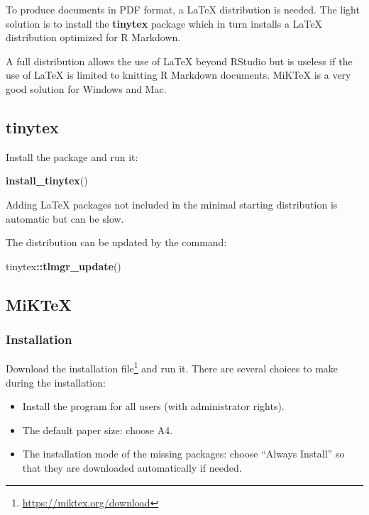 \documentclass[
  12pt,
  american,
  a4paper,
  extrafontsizes,onecolumn,openright
  ]{memoir}
\newenvironment{Shaded}{\begin{snugshade}}{\end{snugshade}}
\newcommand{\FunctionTok}[1]{\textcolor[rgb]{0.13,0.29,0.53}{\textbf{#1}}}
\newcommand{\NormalTok}[1]{#1}
\newcommand{\SpecialCharTok}[1]{\textcolor[rgb]{0.81,0.36,0.00}{\textbf{#1}}}
\providecommand{\tightlist}{%
  \setlength{\itemsep}{0pt}\setlength{\parskip}{0pt}}
\begin{document}
To produce documents in PDF format, a LaTeX distribution is needed.
The light solution is to install the \textbf{tinytex} package which in turn installs a LaTeX distribution optimized for R Markdown.

A full distribution allows the use of LaTeX beyond RStudio but is useless if the use of LaTeX is limited to knitting R Markdown documents.
MiKTeX is a very good solution for Windows and Mac.

\subsection{tinytex}\label{tinytex}

Install the package and run it:

\scriptsize

\begin{Shaded}
\begin{Highlighting}[]
\FunctionTok{install\_tinytex}\NormalTok{()}
\end{Highlighting}
\end{Shaded}

\normalsize

Adding LaTeX packages not included in the minimal starting distribution is automatic but can be slow.

The distribution can be updated by the command:

\scriptsize

\begin{Shaded}
\begin{Highlighting}[]
\NormalTok{tinytex}\SpecialCharTok{::}\FunctionTok{tlmgr\_update}\NormalTok{()}
\end{Highlighting}
\end{Shaded}

\normalsize

\subsection{MiKTeX}\label{miktex}

\subsubsection{Installation}\label{installation-2}

Download the installation file\footnote{\url{https://miktex.org/download}} and run it.
There are several choices to make during the installation:

\begin{itemize}
\tightlist
\item
  Install the program for all users (with administrator rights).
\item
  The default paper size: choose A4.
\item
  The installation mode of the missing packages: choose \enquote{Always Install} so that they are downloaded automatically if needed.
\end{itemize}
\end{document}
